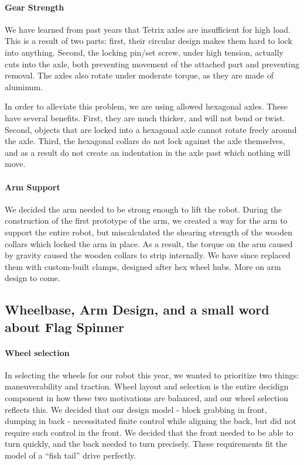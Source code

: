 \paragraph{Gear Strength} We have learned from past years that Tetrix axles are insufficient for high load. This is a result of two parts: first, their circular design makes them hard to lock into anything. Second, the locking pin/set screw, under high tension, actually cuts into the axle, both preventing movement of the attached part and preventing removal. The axles also rotate under moderate torque, as they are made of aluminum.

In order to alleviate this problem, we are using allowed hexagonal axles. These have several benefits. First, they are much thicker, and will not bend or twist. Second, objects that are locked into a hexagonal axle cannot rotate freely around the axle. Third, the hexagonal collars do not lock against the axle themselves, and as a result do not create an indentation in the axle past which nothing will move. 

\paragraph{Arm Support} We decided the arm needed to be strong enough to lift the robot. During the construction of the first prototype of the arm, we created a way for the arm to support the entire robot, but miscalculated the shearing strength of the wooden collars which locked the arm in place. As a result, the torque on the arm caused by gravity caused the wooden collars to strip internally. We have since replaced them with custom-built clamps, designed after hex wheel hubs. More on arm design to come.

\subsection{Wheelbase, Arm Design, and a small word about Flag Spinner}
\paragraph{Wheel selection} In selecting the wheels for our robot this year, we wanted to prioritize two things: maneuverability and traction. Wheel layout and selection is the entire decidign component in how these two motivations are balanced, and our wheel selection reflects this. We decided that our design model - block grabbing in front, dumping in back - necessitated finite control while aligning the back, but did not require such control in the front. We decided that the front needed to be able to turn quickly, and the back needed to turn precisely. These requirements fit the model of a ``fish tail'' drive perfectly.

